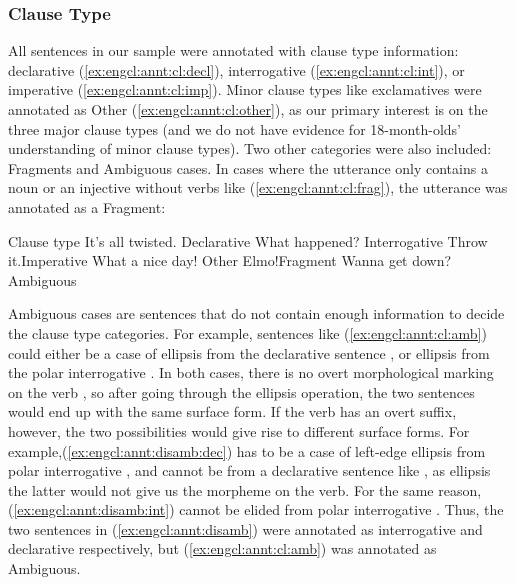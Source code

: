 \subsubsection{Clause Type}

All sentences in our sample were annotated with clause type information: declarative (\ref{ex:engcl:annt:cl:decl}), interrogative (\ref{ex:engcl:annt:cl:int}), or imperative (\ref{ex:engcl:annt:cl:imp}). Minor clause types like exclamatives were annotated as Other (\ref{ex:engcl:annt:cl:other}), as our primary interest is on the three major clause types (and we do not have evidence for 18-month-olds' understanding of minor clause types). Two other categories were also included: Fragments and Ambiguous cases. In cases where the utterance only contains a noun or an injective without verbs like (\ref{ex:engcl:annt:cl:frag}), the utterance was annotated as a Fragment: 

Clause type
\bxl
\label{ex:engcl:annt:cl:decl}
It’s all twisted. \hfill Declarative
\ex \label{ex:engcl:annt:cl:int} What happened?	\hfill Interrogative
\ex \label{ex:engcl:annt:cl:imp} Throw it.\hfill Imperative
\ex \label{ex:engcl:annt:cl:other} What a nice day! \hfill Other
\ex \label{ex:engcl:annt:cl:frag}	Elmo!\hfill	Fragment
\ex \label{ex:engcl:annt:cl:amb} Wanna get down?	\hfill Ambiguous
\exl
\eex

Ambiguous cases are sentences that do not contain enough information to decide the clause type categories. For example, sentences like (\ref{ex:engcl:annt:cl:amb}) could either be a case of ellipsis from the declarative sentence , or ellipsis from the polar interrogative . In both cases, there is no overt morphological marking on the verb , so after going through the ellipsis operation, the two sentences would end up with the same surface form. If the verb has an overt suffix, however, the two possibilities would give rise to different surface forms. For example,(\ref{ex:engcl:annt:disamb:dec}) has to be a case of left-edge ellipsis from polar interrogative , and cannot be from a declarative sentence like , as ellipsis the latter would not give us the  morpheme on the verb. For the same reason, (\ref{ex:engcl:annt:disamb:int}) cannot be elided from polar interrogative . Thus, the two sentences in (\ref{ex:engcl:annt:disamb}) were annotated as interrogative and declarative respectively, but (\ref{ex:engcl:annt:cl:amb}) was annotated as Ambiguous.

